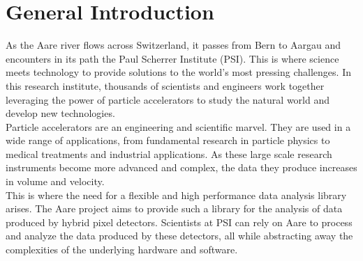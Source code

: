 \chapter*{General Introduction}

\begin{spacing}{1.2}




As the Aare river flows across Switzerland, it passes from Bern to Aargau and encounters in 
its path the Paul Scherrer Institute (PSI). This is where science meets technology to provide solutions
to the world's most pressing challenges. In this research institute, thousands of scientists
and engineers work together leveraging the power of particle accelerators to study the
natural world and develop new technologies. \\

Particle accelerators are an engineering and scientific marvel. They are used in a wide range of
applications, from fundamental research in particle physics to medical treatments and industrial
applications. As these large scale research instruments become more advanced and complex, the data they produce
increases in volume and velocity.\\

This is where the need for a flexible and high performance data analysis library arises. The Aare
project aims to provide such a library for the analysis of data produced by hybrid pixel detectors.
Scientists at PSI can rely on Aare to process and analyze the data produced by these detectors,
all while abstracting away the complexities of the underlying hardware and software.\\


\end{spacing}
